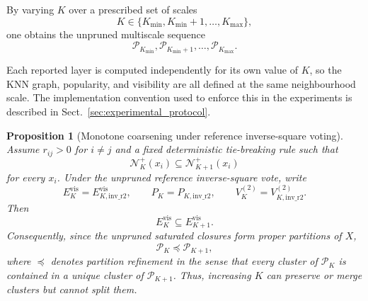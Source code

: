 \documentclass[pdflatex,sn-basic,Numbered]{sn-jnl}
\newtheorem{proposition}[theorem]{Proposition}
\newcommand{\calN}{\mathcal{N}}
\newcommand{\calP}{\mathcal{P}}
\begin{document}
By varying $K$ over a prescribed set of scales
\begin{equation}
K\in
\{K_{\min},K_{\min}+1,\ldots,K_{\max}\},
\end{equation}
one obtains the unpruned multiscale sequence
\begin{equation}
\calP_{K_{\min}},
\calP_{K_{\min}+1},
\ldots,
\calP_{K_{\max}}.
\end{equation}

Each reported layer is computed independently for its own value of $K$, so
the KNN graph, popularity, and visibility are all defined at the same
neighbourhood scale. The implementation convention used to enforce this in the
experiments is described in Sect.~\ref{sec:experimental_protocol}.

\begin{proposition}[Monotone coarsening under reference inverse-square voting]
\label{prop:inverse_square_coarsening}
Assume $r_{ij}>0$ for $i\neq j$ and a fixed deterministic tie-breaking rule
such that
\begin{equation}
\calN_K^+(x_i)\subseteq\calN_{K+1}^+(x_i)
\label{eq:nested_knn}
\end{equation}
for every $x_i$. Under the unpruned reference inverse-square vote, write
\begin{equation}
E_K^{\mathrm{vis}}
=
E_{K,\mathrm{inv\_r2}}^{\mathrm{vis}},
\qquad
P_K
=
P_{K,\mathrm{inv\_r2}},
\qquad
V_K^{(2)}
=
V_{K,\mathrm{inv\_r2}}^{(2)}.
\label{eq:inverse_square_shorthand}
\end{equation}
Then
\begin{equation}
E_K^{\mathrm{vis}}
\subseteq
E_{K+1}^{\mathrm{vis}}.
\label{eq:nested_visible_edges}
\end{equation}
Consequently, since the unpruned saturated closures form proper partitions of \(X\),
\begin{equation}
\calP_K\preceq\calP_{K+1},
\label{eq:partition_refinement}
\end{equation}
where $\preceq$ denotes partition refinement in the sense that every cluster
of $\calP_K$ is contained in a unique cluster of $\calP_{K+1}$. Thus,
increasing $K$ can preserve or merge clusters but cannot split them.
\end{proposition}
\end{document}
